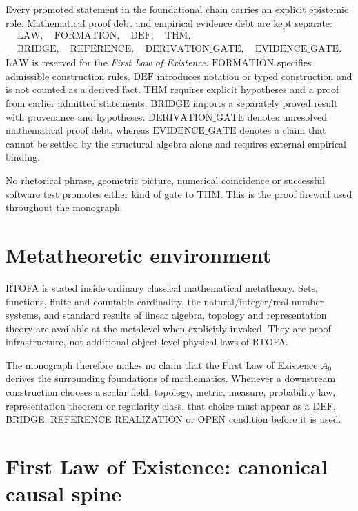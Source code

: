 \documentclass[11pt]{article}
\begin{document}
Every promoted statement in the foundational chain carries an explicit
epistemic role. Mathematical proof debt and empirical evidence debt are kept
separate:
\[
\boxed{
\begin{gathered}
\mathrm{LAW},\quad
\mathrm{FORMATION},\quad
\mathrm{DEF},\quad
\mathrm{THM},\\
\mathrm{BRIDGE},\quad
\mathrm{REFERENCE},\quad
\mathrm{DERIVATION\_GATE},\quad
\mathrm{EVIDENCE\_GATE}.
\end{gathered}
}
\]
\(\mathrm{LAW}\) is reserved for the \emph{First Law of Existence}.
\(\mathrm{FORMATION}\) specifies admissible construction rules.
\(\mathrm{DEF}\) introduces notation or typed construction and is not
counted as a derived fact. \(\mathrm{THM}\) requires explicit hypotheses
and a proof from earlier admitted statements. \(\mathrm{BRIDGE}\) imports
a separately proved result with provenance and hypotheses.
\(\mathrm{DERIVATION\_GATE}\) denotes unresolved mathematical proof debt,
whereas \(\mathrm{EVIDENCE\_GATE}\) denotes a claim that cannot be settled
by the structural algebra alone and requires external empirical binding.

No rhetorical phrase, geometric picture, numerical coincidence or successful
software test promotes either kind of gate to THM. This is the proof firewall
used throughout the monograph.

\section*{Metatheoretic environment}

RTOFA is stated inside ordinary classical mathematical metatheory. Sets,
functions, finite and countable cardinality, the natural/integer/real number
systems, and standard results of linear algebra, topology and representation
theory are available at the metalevel when explicitly invoked. They are
proof infrastructure, not additional object-level physical laws of RTOFA.

The monograph therefore makes no claim that the First Law of Existence
\(A_0\) derives the surrounding foundations of mathematics. Whenever a
downstream construction chooses a scalar field, topology, metric, measure,
probability law, representation theorem or regularity class, that choice must
appear as a DEF, BRIDGE, REFERENCE REALIZATION or OPEN condition before it is
used.

\section{First Law of Existence: canonical causal spine}
\end{document}

